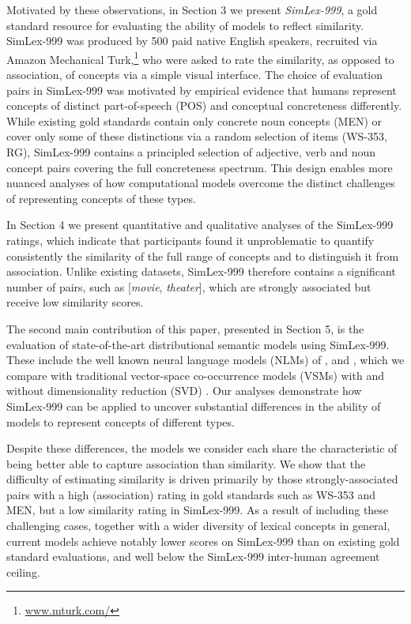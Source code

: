 Motivated by these observations, in Section 3 we present \emph{SimLex-999}, a gold standard resource for evaluating the ability of models to reflect similarity. SimLex-999 was produced by 500 paid native English speakers, recruited via Amazon Mechanical Turk,\footnote{\url{www.mturk.com/}} who were asked to rate the similarity, as opposed to association, of concepts via a simple visual interface. The choice of evaluation pairs in SimLex-999 was motivated by empirical evidence that humans represent concepts of distinct part-of-speech (POS) \cite{gentner1978relational} and conceptual concreteness \cite{hill2013quantitative} differently. While existing gold standards contain only concrete noun concepts (MEN) or cover only some of these distinctions via a random selection of items (WS-353, RG), SimLex-999 contains a principled selection of adjective, verb and noun concept pairs covering the full concreteness spectrum. This design enables more nuanced analyses of how computational models overcome the distinct challenges of representing concepts of these types. 

In Section 4 we present quantitative and qualitative analyses of the SimLex-999 ratings, which indicate that participants found it unproblematic to quantify consistently the similarity of the full range of concepts and to distinguish it from association. Unlike existing datasets, SimLex-999 therefore contains a significant number of pairs, such as [\emph{movie}, \emph{theater}], which are strongly associated but receive low similarity scores.   

The second main contribution of this paper, presented in Section 5, is the evaluation of state-of-the-art distributional semantic models using SimLex-999. These include the well known neural language models (NLMs) of \cite{huang2012improving}, \cite{collobert2008unified} and \cite{mikolov2013efficient}, which we compare with traditional vector-space co-occurrence models (VSMs) \cite{turney2010frequency} with and without dimensionality reduction (SVD) \cite{landauer1997solution}. Our analyses demonstrate how SimLex-999 can be applied to uncover substantial differences in the ability of models to represent concepts of different types. 

Despite these differences, the models we consider each share the characteristic of being better able to capture association than similarity. We show that the difficulty of estimating similarity is driven primarily by those strongly-associated pairs with a high (association) rating in gold standards such as WS-353 and MEN, but a low similarity rating in SimLex-999. As a result of including these challenging cases, together with a wider diversity of lexical concepts in general, current models achieve notably lower scores on SimLex-999 than on existing gold standard evaluations, and well below the SimLex-999 inter-human agreement ceiling. 

